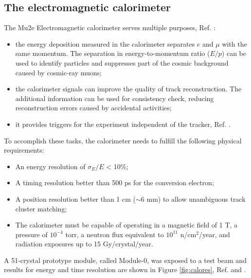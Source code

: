 \subsection{The electromagnetic calorimeter}\label{calorimeter}
The Mu2e Electromagnetic calorimeter serves multiple purposes, Ref. \cite{em4}:
\begin{itemize}
    \item the energy deposition measured in the calorimeter separates 
    $e$ and $\mu$ with the same momentum.
    The separation in energy-to-momentum ratio ($E/p$) can be used to 
    identify particles and suppresses
    part of the cosmic background caused by cosmic-ray muons;
    \item the calorimeter signals can improve the quality of track reconstruction. 
    The additional information can
    be used for consistency check, reducing reconstruction errors caused by accidental 
    activities;
    \item it provides triggers for the experiment independent of the tracker, Ref. \cite{em6}. 
\end{itemize} 
To accomplish these tasks, the calorimeter needs to fulfill 
the following physical requirements:
\begin{itemize}
    \item An energy resolution of $\sigma_E/E$ < 10\%;
    \item A timing resolution better than 500 ps for the conversion electron;
    \item A position resolution better than 1 cm ($\sim$6 mm) to allow 
    unambiguous track cluster matching;
    \item The calorimeter must be capable of operating in 
    a magnetic field of 1 T, a pressure of \(10^{-4}\) torr, a 
    neutron flux equivalent to \(10^{11}\) n/cm\(^2\)/year, 
    and radiation exposures up to 15 Gy/crystal/year.
\end{itemize}
A 51-crystal prototype module, called Module-0, was exposed
to a test beam and results for energy and time resolution are
shown in Figure \ref{fig:calores}, Ref. \cite{bobbb} and \cite{calo95}.
